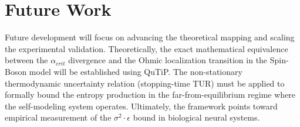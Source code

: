 \documentclass[12pt]{article}
\begin{document}
\section{Future Work}

Future development will focus on advancing the theoretical mapping and scaling the experimental validation. Theoretically, the exact mathematical equivalence between the $\alpha_{crit}$ divergence and the Ohmic localization transition in the Spin-Boson model will be established using QuTiP. The non-stationary thermodynamic uncertainty relation (stopping-time TUR) must be applied to formally bound the entropy production in the far-from-equilibrium regime where the self-modeling system operates. Ultimately, the framework points toward empirical measurement of the $\sigma^2 \cdot \epsilon$ bound in biological neural systems.



\end{document}
